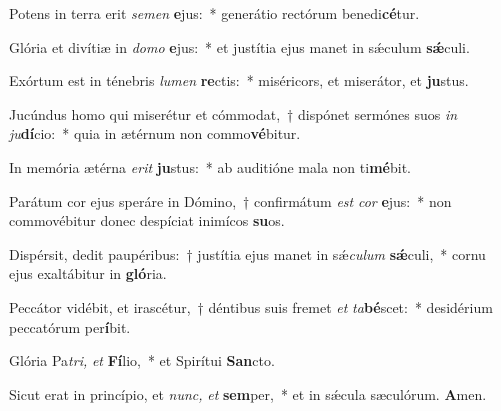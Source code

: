 \item Potens in terra erit \textit{semen} \textbf{e}jus:~* generátio rectórum benedi\textbf{cé}tur.
\item Glória et divítiæ in \textit{domo} \textbf{e}jus:~* et justítia ejus manet in sǽculum \textbf{sǽ}culi.
\item Exórtum est in ténebris \textit{lumen} \textbf{re}ctis:~* miséricors, et miserátor, et \textbf{ju}stus.
\item Jucúndus homo qui miserétur et cómmodat,~† dispónet sermónes suos \textit{in} \textit{ju}\textbf{dí}cio:~* quia in ætérnum non commo\textbf{vé}bitur.
\item In memória ætérna \textit{erit} \textbf{ju}stus:~* ab auditióne mala non ti\textbf{mé}bit.
\item Parátum cor ejus speráre in Dómino,~† confirmátum \textit{est} \textit{cor} \textbf{e}jus:~* non commovébitur donec despíciat inimícos \textbf{su}os.
\item Dispérsit, dedit paupéribus:~† justítia ejus manet in sǽ\hspace{0.03em}\textit{culum} \textbf{sǽ}culi,~* cornu ejus exaltábitur in \textbf{gló}ria.
\item Peccátor vidébit, et irascétur,~† déntibus suis fremet \textit{et} \textit{ta}\textbf{bé}scet:~* desidérium peccatórum per\textbf{í}bit.
\item Glória Pa\hspace{0.03em}\textit{tri,} \textit{et} \textbf{Fí}lio,~* et Spirítui \textbf{San}cto.
\item Sicut erat in princípio, et \textit{nunc,} \textit{et} \textbf{sem}per,~* et in sǽcula sæculórum. \textbf{A}men.
